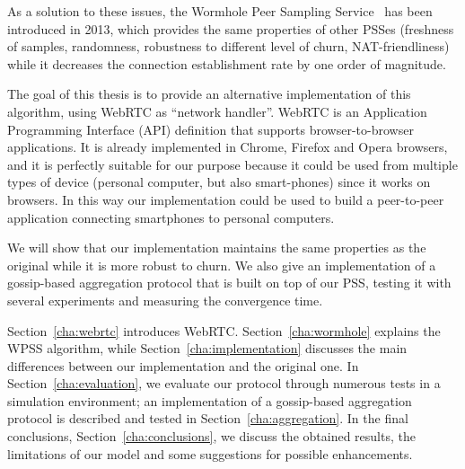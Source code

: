As a solution to these issues, the Wormhole Peer Sampling Service~\cite{wormhole} has been introduced in 2013, which provides the same properties of other PSSes (freshness of samples, randomness, robustness to different level of churn, NAT-friendliness) while it decreases the connection establishment rate by one order of magnitude. 

The goal of this thesis is to provide an alternative implementation of this algorithm, using WebRTC as ``network handler''. WebRTC is an Application Programming Interface (API) definition that supports browser-to-browser applications. It is already implemented in Chrome, Firefox and Opera browsers, and it is perfectly suitable for our purpose because it could be used from multiple types of device (personal computer, but also smart-phones) since it works on browsers. In this way our implementation could be used to build a peer-to-peer application connecting smartphones to  personal computers.

We will show that our implementation maintains the same properties as the original while it is more robust to churn. We also give an implementation of a gossip-based aggregation protocol that is built on top of our PSS, testing it with several experiments and measuring the convergence time.

Section~\ref{cha:webrtc} introduces WebRTC. Section~\ref{cha:wormhole} explains the WPSS algorithm, while Section~\ref{cha:implementation} discusses the main differences between our implementation and the original one. In Section~\ref{cha:evaluation}, we evaluate our protocol through numerous tests in a simulation environment; an implementation of a gossip-based aggregation protocol is described and tested in Section~\ref{cha:aggregation}. In the final conclusions, Section~\ref{cha:conclusions}, we discuss the obtained results, the limitations of our model and some suggestions for possible enhancements.
